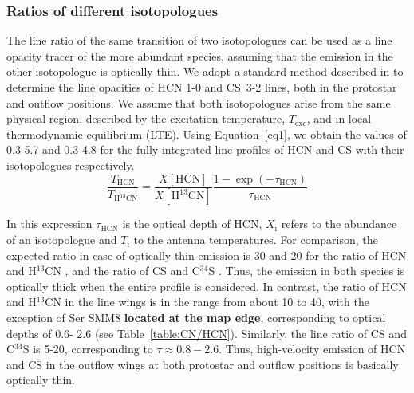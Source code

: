 \documentclass{aa}
\begin{document}
\subsubsection{Ratios of different isotopologues}
\label{subsection:isotopologues}

The line ratio of the same transition of two isotopologues can be used as a line opacity tracer 
of the more abundant species, assuming that the emission in the 
other isotopologue is optically thin. We adopt a standard method described in \cite{Gol84} 
to determine the line opacities of HCN 1-0 and \mbox{CS 3-2} lines, both in the protostar 
and outflow positions. We assume that both isotopologues arise from the 
same physical region, described by the excitation temperature, $T_\mathrm{exc}$, and 
in local thermodynamic equilibrium (LTE). Using Equation~\ref{eq1}, we obtain
the values of 0.3-5.7 and 0.3-4.8 for the fully-integrated line profiles of HCN and CS with their isotopologues respectively.
\begin{equation} 
\label{eq1} \frac{T_{\mathrm{HCN}}}{T_{\mathrm{H^{13}CN}}} =
\frac{X[\mathrm{HCN}]}{X[\mathrm{H^{13}CN}]} \frac
{1-\exp(-\tau_{\mathrm{HCN}})}{\tau_{\mathrm{HCN}}} 
\end{equation} 

In this expression $\tau_{\mathrm{HCN}}$ is the optical depth of HCN, $X_{\mathrm{i}}$ refers to the abundance of an isotopologue and $T_{\mathrm{i}}$ to the antenna temperatures. For comparison, the expected ratio in case of optically thin emission is 30 and 20 for the ratio of HCN and H$^{13}$CN \citep{Dan13}, and the ratio of CS and C$^{34}$S \citep{Ter10}. Thus,
the emission in both species is optically thick when the entire
profile is considered. In contrast, the ratio of HCN and H$^{13}$CN
in the line wings is in the range from about 10 to 40, with the
exception of Ser SMM8 \textbf{located at the map edge}, corresponding to optical depths of 0.6-
2.6 (see Table~\ref{table:CN/HCN}). Similarly, the line ratio of CS and C$^{34}$S is 5-20,
corresponding to $\tau \approx 0.8-2.6$. Thus, high-velocity emission of
HCN and CS in the outflow wings at both protostar and outflow
positions is basically optically thin.
\end{document}
